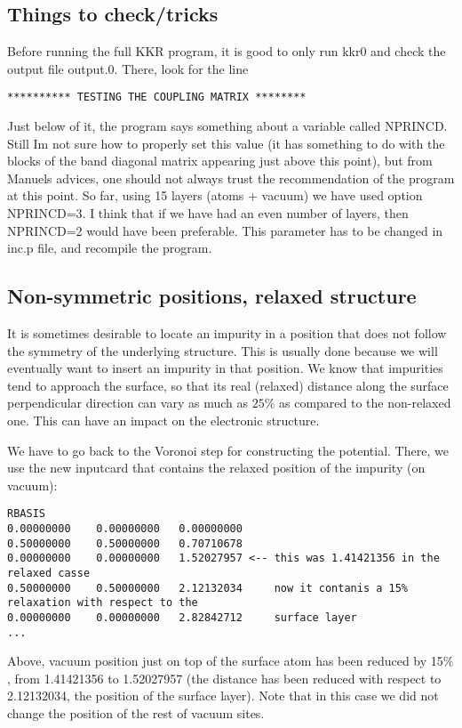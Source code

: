 \documentclass[a4paper,10pt,fullpage]{report}
\begin{document}
\subsection{Things to check/tricks}

Before running the full KKR program, it is good to only run
kkr0 and check the output file output.0. There, look for the line
\begin{verbatim}
********** TESTING THE COUPLING MATRIX ********
\end{verbatim}
Just below of it, the program says something about a variable called 
NPRINCD. Still Im not sure how to properly set this value
(it has something to do with the blocks of the band diagonal matrix appearing
just above this point), but from Manuels
advices, one should not always trust the recommendation of the program at this point.
So far, using 15 layers (atoms + vacuum) we have used option NPRINCD=3.
I think that if we have had an even number of layers, then NPRINCD=2 would have been preferable.
This parameter has to be changed in inc.p file, and recompile the program.

\subsection{Non-symmetric positions, relaxed structure}

It is sometimes desirable to locate an impurity in a position
that does not follow the symmetry of the underlying structure.
This is usually done because we will eventually want to insert an impurity
in that position. We know that impurities tend to approach the surface,
so that its real (relaxed) distance along the surface perpendicular direction 
can vary as much as $25\%$ as compared to the non-relaxed one. This can have an impact on
the electronic structure.

We have to go back to the Voronoi step for constructing the potential. 
There, we use the new inputcard that contains the relaxed position of the impurity (on vacuum):
\begin{verbatim}
RBASIS
0.00000000    0.00000000   0.00000000
0.50000000    0.50000000   0.70710678
0.00000000    0.00000000   1.52027957 <-- this was 1.41421356 in the relaxed casse
0.50000000    0.50000000   2.12132034     now it contanis a 15% relaxation with respect to the
0.00000000    0.00000000   2.82842712     surface layer
...
\end{verbatim}
Above, vacuum position just on top of the surface atom
has been reduced by 15$\%$, from 1.41421356 to 1.52027957
(the distance has been reduced with respect to 2.12132034, the position
of the surface layer).
Note that in this case we did not change the position of the rest
of vacuum sites.
\end{document}
